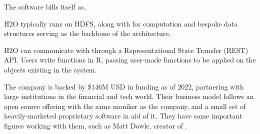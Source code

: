 The  software bills itself as,


H2O typically runs on HDFS, along with  for computation and bespoke data structures serving as the backbone of the architecture.

H2O can communicate with \R{} through a Representational State Transfer (REST) API.
Users write functions in R, passing user-made functions to be applied on the objects existing in the  system\cite{h2o.ai:_h2o}.

The company  is backed by \$146M USD in funding as of 2022, partnering with large institutions in the financial and tech world.
Their business model follows an open source offering with the same moniker as the company, and a small set of heavily-marketed proprietary software in aid of it.
They have some important figures working with them, such as Matt Dowle, creator of .
